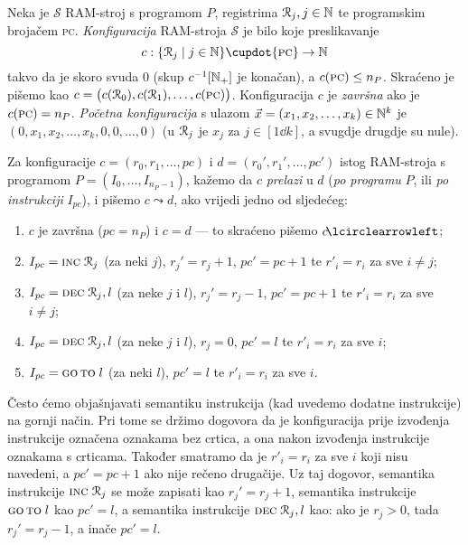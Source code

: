 \begin{definicija}[{name=[RAM-konfiguracije i prijelazi među njima]}]\label{def:RAMconf}
Neka je $\mathcal S$ RAM-stroj s programom $P$, registrima $\mathcal R_{j},j\in{\mathbb N}$ te programskim brojačem \textsc{pc}. \emph{Konfiguracija} RAM-stroja $\mathcal S$ je bilo koje preslikavanje
\begin{equation}
    c:\{\reg{j}\mid j\in\N\}\dcup\{\textsc{pc}\}\to\N
\end{equation} takvo da je skoro svuda $0$ (skup $c^{-1}[{\mathbb N}_+]$ je konačan), a $c(\textsc{pc})\le n_P$. Skraćeno je pišemo kao $c=\bigl(c(\mathcal R_{0}),c(\mathcal R_{1}),\dotsc,c(\textsc{pc})\bigr)$. Konfiguracija $c$ je \emph{završna} ako je $c(\textsc{pc})=n_P$. \emph{Početna konfiguracija} s ulazom $\vec x=(x_1,x_2,\dotsc,x_k)\in{\mathbb N}^k$ je $(0,x_1,x_2,\dotsc,x_k,0,0,\dotsc,0)$ (u $\mathcal R_{j}$ je $x_j$ za $j\in[1\dd k]$, a svugdje drugdje su nule).

    Za konfiguracije $c=(r_0,r_1,\dotsc,pc)$ i $d=(r_0',r_1',\dotsc,pc')$ istog RAM-stroja s programom $P=(I_0,\dotsc,I_{n_P-1})$, kažemo da $c$ \emph{prelazi} u $d$ (\emph{po programu} $P$, ili \emph{po instrukciji} $I_{pc}$), i pišemo $c\leadsto d$, ako vrijedi jedno od sljedećeg:
\begin{enumerate}
    \item\label{stav:leadzav}
    $c$ je završna ($pc=n_P$) i $c=d$ --- to skraćeno pišemo $c\!\lcirclearrowleft$\!;
    \item\label{stav:leadINC}
    $I_{pc}=\textsc{inc}\;\mathcal R_{j}$ (za neki $j$), $r_j'=r_j+1$, $pc'=pc+1$ te $r'_i=r_i$ za sve $i\ne j$;
    \item\label{stav:leadDEC-}
    $I_{pc}=\textsc{dec}\;\mathcal R_{j},l$ (za neke $j$ i $l$),  $r_j'=r_j-1$, $pc'=pc+1$ te $r'_i=r_i$ za sve $i\ne j$;
    \item\label{stav:leadDEC0}
    $I_{pc}=\textsc{dec}\;\mathcal R_{j},l$ (za neke $j$ i $l$), $r_j=0$, $pc'=l$ te $r'_i=r_i$ za sve $i$;
    \item\label{stav:leadGOTO}
    $I_{pc}=\textsc{go\,to}\;l$ (za neki $l$), $pc'=l$ te $r'_i=r_i$ za sve $i$.\qedhere
\end{enumerate}
\end{definicija}

Često ćemo objašnjavati semantiku instrukcija (kad uvedemo dodatne instrukcije) na gornji način. Pri tome se držimo dogovora da je konfiguracija prije izvođenja instrukcije označena oznakama bez crtica, a ona nakon izvođenja instrukcije oznakama s crticama. Također smatramo da je $r'_i=r_i$ za sve $i$ koji nisu navedeni, a $pc'=pc+1$ ako nije rečeno drugačije. Uz taj dogovor, semantika instrukcije $\textsc{inc}\;\mathcal R_{j}$ se može zapisati kao $r_j'=r_j+1$, semantika instrukcije $\textsc{go\,to}\;l$ kao $pc'=l$, a semantika instrukcije $\textsc{dec}\;\mathcal R_{j},l$ kao: ako je $r_j>0$, tada $r_j'=r_j-1$, a inače $pc'=l$.

